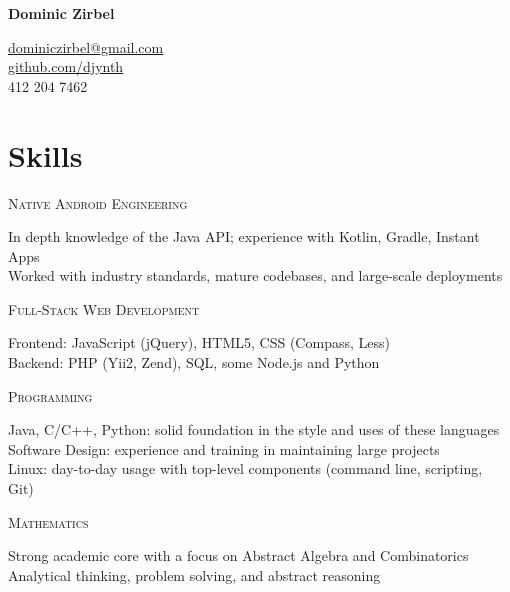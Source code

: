\documentclass[letterpaper,10pt]{article}
\newenvironment{resumecols1}[1]
{
    \vspace{.11cm}
    \begin{minipage}[t]{.21\linewidth}
        \begin{flushright}
            \textsc{#1}
        \end{flushright}
    \end{minipage}
    \hspace{.005\linewidth}
    \begin{minipage}[t]{.77\linewidth}
}
{
    \end{minipage}
    \vspace{.11cm}
}
\begin{document}
\thispagestyle{empty}

\begin{minipage}[t]{.5\linewidth}
    \vspace{0pt}
    \textbf{\Large{Dominic Zirbel}}
\end{minipage}
\begin{minipage}[t]{.49\linewidth}
    \vspace{0pt}
    \begin{flushright}
        \href{mailto:dominiczirbel@gmail.com}{dominiczirbel@gmail.com} \\
        \href{https://github.com/djynth}{github.com/djynth} \\
        412 204 7462
    \end{flushright}
\end{minipage}

\section{Skills}

\begin{resumecols1}{Native Android Engineering}
    In depth knowledge of the Java API; experience with Kotlin, Gradle, Instant Apps \\
    Worked with industry standards, mature codebases, and large-scale deployments
\end{resumecols1}

\begin{resumecols1}{Full-Stack Web Development}
    Frontend: JavaScript (jQuery), HTML5, CSS (Compass, Less) \\
    Backend: PHP (Yii2, Zend), SQL, some Node.js and Python
\end{resumecols1}

\begin{resumecols1}{Programming}
    Java, C/C++, Python: solid foundation in the style and uses of these languages \\
    Software Design: experience and training in maintaining large projects \\
    Linux: day-to-day usage with top-level components (command line, scripting, Git)
\end{resumecols1}

\begin{resumecols1}{Mathematics}
    Strong academic core with a focus on Abstract Algebra and Combinatorics \\
    Analytical thinking, problem solving, and abstract reasoning
\end{resumecols1}
\end{document}
